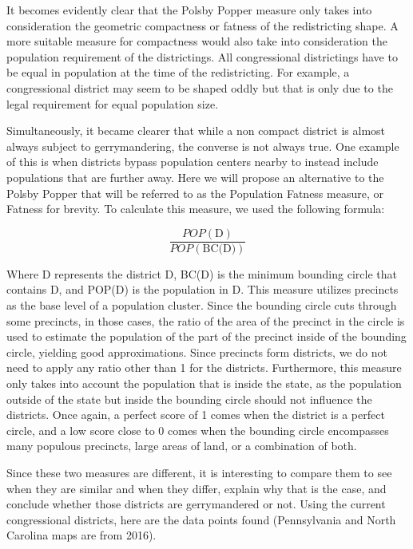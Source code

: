 \documentclass[letterpaper]{article}
\begin{document}
It becomes evidently clear that the Polsby Popper measure only takes into consideration the geometric compactness or fatness of the redistricting shape. A more suitable measure for compactness would also take into consideration the population requirement of the districtings. All congressional districtings have to be equal in population at the time of the redistricting. For example, a congressional district may seem to be shaped oddly but that is only due to the legal requirement for equal population size.

Simultaneously, it became clearer that while a non compact district is almost always subject to gerrymandering, the converse is not always true. One example of this is when districts bypass population centers nearby to instead include populations that are further away.
Here we will propose an alternative to the Polsby Popper that will be referred to as the Population Fatness measure, or Fatness for brevity. 
To calculate this measure, we used the following formula:

\[
	\frac{POP(\text{D})}{POP(\text{BC(D)})}
\]

Where D represents the district D, BC(D) is the minimum bounding circle that contains D, and POP(D) is the population in D. This measure utilizes precincts as the base level of a population cluster. Since the bounding circle cuts through some precincts, in those cases, the ratio of the area of the precinct in the circle is used to estimate the population of the part of the precinct inside of the bounding circle, yielding good approximations. Since precincts form districts, we do not need to apply any ratio other than 1 for the districts. Furthermore, this measure only takes into account the population that is inside the state, as the population outside of the state but inside the bounding circle should not influence the districts. Once again, a perfect score of 1 comes when the district is a perfect circle, and a low score close to 0 comes when the bounding circle encompasses many populous precincts, large areas of land, or a combination of both.


Since these two measures are different, it is interesting to compare them to see when they are similar and when they differ, explain why that is the case, and conclude whether those districts are gerrymandered or not. Using the current congressional districts, here are the data points found (Pennsylvania and North Carolina maps are from 2016).
\end{document}

